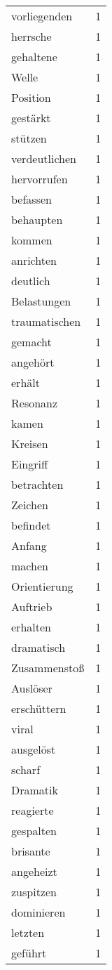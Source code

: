 \begin{tabular}{lr}
vorliegenden & 1 \\
herrsche & 1 \\
gehaltene & 1 \\
Welle & 1 \\
Position & 1 \\
gestärkt & 1 \\
stützen & 1 \\
verdeutlichen & 1 \\
hervorrufen & 1 \\
befassen & 1 \\
behaupten & 1 \\
kommen & 1 \\
anrichten & 1 \\
deutlich & 1 \\
Belastungen & 1 \\
traumatischen & 1 \\
gemacht & 1 \\
angehört & 1 \\
erhält & 1 \\
Resonanz & 1 \\
kamen & 1 \\
Kreisen & 1 \\
Eingriff & 1 \\
betrachten & 1 \\
Zeichen & 1 \\
befindet & 1 \\
Anfang & 1 \\
machen & 1 \\
Orientierung & 1 \\
Auftrieb & 1 \\
erhalten & 1 \\
dramatisch & 1 \\
Zusammenstoß & 1 \\
Auslöser & 1 \\
erschüttern & 1 \\
viral & 1 \\
ausgelöst & 1 \\
scharf & 1 \\
Dramatik & 1 \\
reagierte & 1 \\
gespalten & 1 \\
brisante & 1 \\
angeheizt & 1 \\
zuspitzen & 1 \\
dominieren & 1 \\
letzten & 1 \\
geführt & 1 \\

\end{tabular}
